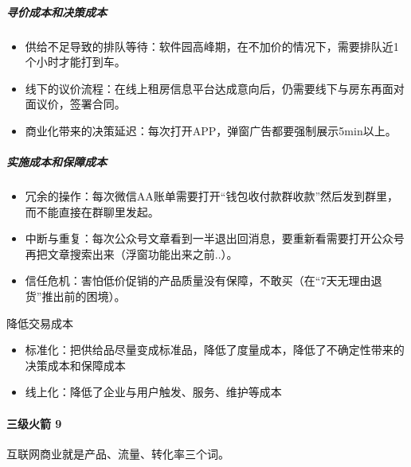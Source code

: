 \documentclass[letterpaper,10pt,english]{sphinxmanual}
\begin{document}
\subparagraph{寻价成本和决策成本}
\label{\detokenize{chapter_idea/business:id22}}\begin{itemize}
\item {} 
供给不足导致的排队等待：软件园高峰期，在不加价的情况下，需要排队近1个小时才能打到车。

\item {} 
线下的议价流程：在线上租房信息平台达成意向后，仍需要线下与房东再面对面议价，签署合同。

\item {} 
商业化带来的决策延迟：每次打开APP，弹窗广告都要强制展示5min以上。

\end{itemize}


\subparagraph{实施成本和保障成本}
\label{\detokenize{chapter_idea/business:id23}}\begin{itemize}
\item {} 
冗余的操作：每次微信AA账单需要打开“钱包\sphinxhyphen{}收付款\sphinxhyphen{}群收款”然后发到群里，而不能直接在群聊里发起。

\item {} 
中断与重复：每次公众号文章看到一半退出回消息，要重新看需要打开公众号再把文章搜索出来（浮窗功能出来之前..）。

\item {} 
信任危机：害怕低价促销的产品质量没有保障，不敢买（在“7天无理由退货”推出前的困境）。

\end{itemize}

降低交易成本
\begin{itemize}
\item {} 
标准化：把供给品尽量变成标准品，降低了度量成本，降低了不确定性带来的决策成本和保障成本

\item {} 
线上化：降低了企业与用户触发、服务、维护等成本

\end{itemize}


\paragraph{三级火箭 9\sphinxfootnotemark[413]}
\label{\detokenize{chapter_idea/business:id24}}%
\begin{footnotetext}[413]\sphinxAtStartFootnote
{}
%
\end{footnotetext}\ignorespaces 
互联网商业就是产品、流量、转化率三个词。
\end{document}
